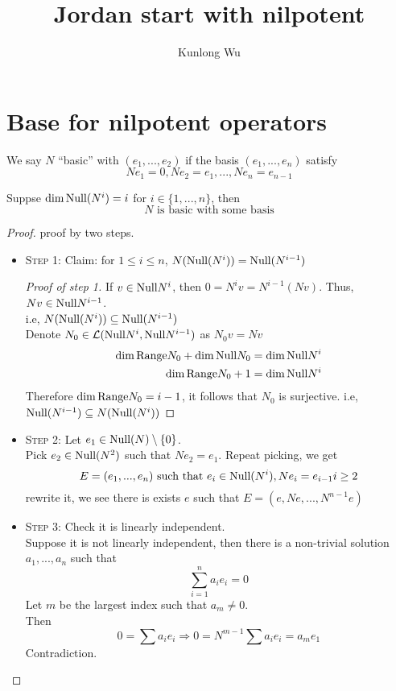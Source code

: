 \documentclass{aq-notes}
\title{\bf Jordan start with nilpotent}
\author{Kunlong Wu}
\newcommand{\Range}{\mbox{\normalfont Range}}
\newcommand{\Null}{\mbox{\normalfont Null}}
\begin{document}
\section{Base for nilpotent operators}

\begin{definition}[basic]
    We say $N$ ``basic'' with $(e_1,...,e_2)$ if the basis $(e_1,...,e_n)$ satisfy
    \[Ne_1= 0,Ne_2 = e_1,...,Ne_n= e_{n-1}\]
\end{definition}
\begin{lemma}
    Suppse $\dim \Null(N^i) = i$ for $i\in \{1,...,n\}$, then
    \[N \mbox{ is basic with some basis}\]
    \begin{proof} proof by two steps.
        \begin{itemize}
            \item {\scshape Step 1:} Claim: for $1\leq i\leq n$, $N(\Null(N^i)) = \Null (N^{i-1})$
            \begin{proof}[Proof of step 1]
                If $v\in \Null N^i$, then $0 = N^iv = N^{i-1}(Nv)$. Thus, $Nv\in \Null N^{i-1}$.\\ 
                i.e, $N(\Null(N^i)) \subseteq \Null (N^{i-1})$ \\
                Denote $N_0\in \mathcal{L}(\Null N^i, \Null N^{i-1})$ as $N_0v = Nv$
                \begin{align*}
                    \dim \Range N_0 + \dim \Null N_0 = \dim \Null N^i\\
                    \dim \Range N_0 + 1 = \dim \Null N^i
                \end{align*}
                Therefore $\dim \Range N_0 = i-1$, it follows that $N_0$ is surjective. i.e, $\Null (N^{i-1})\subseteq N(\Null(N^i))$
            \end{proof}
            \item {\scshape Step 2:} Let $e_1\in \Null (N)\setminus \{0\}$.\\
            Pick $e_2 \in \Null (N^2)$ such that $Ne_2 = e_1$. Repeat picking, we get
            \[E  = (e_1,...,e_n) \mbox{ such that } e_i \in \Null(N^i), Ne_i = e_{i-1} i\geq 2\]
            rewrite it, we see there is exists $e$ such that $E= (e,Ne,...,N^{n-1}e)$
            \vspace{1em}
            \item {\scshape Step 3:} Check it is linearly independent.\\
            Suppose it is not linearly independent, then there is a non-trivial solution $a_1,...,a_n$ such that
            \[\sum_{i=1}^na_ie_i = 0\]
            Let $m$ be the largest index such that $a_m \neq 0$.\\
            Then \[0 = \sum a_ie_i \Rightarrow 0 = N^{m-1}\sum a_ie_i = a_me_1\] Contradiction.
        \end{itemize}
    \end{proof}
\end{lemma}
\end{document}

